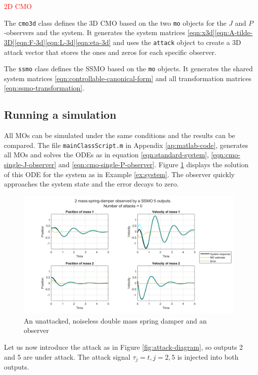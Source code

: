 \textcolor{red}{2D CMO}

The \texttt{cmo3d} class defines the 3D CMO based on the two \texttt{mo} objects for the $J$ and $P$-observers and the system. It generates the system matrices \eqref{eqn:x3d}\eqref{eqn:A-tilde-3D}\eqref{eqn:F-3d}\eqref{eqn:L-3d}\eqref{eqn:eta-3d} and uses the \texttt{attack} object to create a 3D attack vector that stores the ones and zeros for each specific observer.

The \texttt{ssmo} class defines the SSMO based on the \texttt{mo} objects. It generates the shared system matrices \eqref{eqn:controllable-canonical-form} and all transformation matrices \eqref{eqn:ssmo-transformation}. 

\subsection{Running a simulation}
All MOs can be simulated under the same conditions and the results can be compared. The file \texttt{mainClassScript.m} in Appendix \ref{ap:matlab-code}, generates all MOs and solves the ODEs as in equation \eqref{eqn:standard-system}, \eqref{eqn:cmo-single-J-observer} and \eqref{eqn:cmo-single-P-observer}. Figure \ref{fig:unattacked-system-plot} displays the solution of this ODE for the system as in Example \ref{ex:system}. The observer quickly approaches the system state and the error decays to zero.

\begin{figure}[ht]
    \centering
    \includegraphics[width=\linewidth]{report/Figures/symplot_5o0a.png}
    \caption{An unattacked, noiseless double mass spring damper and an observer}
    \label{fig:unattacked-system-plot}
\end{figure}

Let us now introduce the attack as in Figure \ref{fig:attack-diagram}, so outputs 2 and 5 are under attack. The attack signal $\tau_j=t,j=2,5$ is injected into both outputs. 

